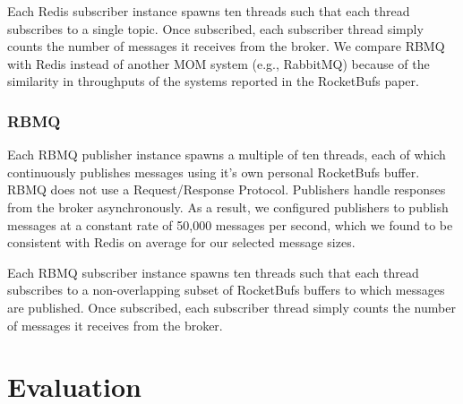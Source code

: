 \documentclass[letterpaper,twocolumn,10pt]{article}
\begin{document}
Each Redis subscriber instance spawns ten threads such that each thread subscribes to a single topic.
Once subscribed, each subscriber thread simply counts the number of messages it receives from the broker.
We compare RBMQ with Redis instead of another MOM system (e.g., RabbitMQ) because of the similarity in throughputs of the systems reported in the RocketBufs paper.

\subsubsection{RBMQ}
Each RBMQ publisher instance spawns a multiple of ten threads, each of which continuously publishes messages using it's own personal RocketBufs buffer.
RBMQ does not use a Request/Response Protocol. Publishers handle responses from the broker asynchronously.
As a result, we configured publishers to publish messages at a constant rate of 50,000 messages per second, which we found to be consistent with Redis on average for our selected message sizes.

Each RBMQ subscriber instance spawns ten threads such that each thread subscribes to a non-overlapping subset of RocketBufs buffers to which messages are published.
Once subscribed, each subscriber thread simply counts the number of messages it receives from the broker.


\section{Evaluation}
\end{document}
